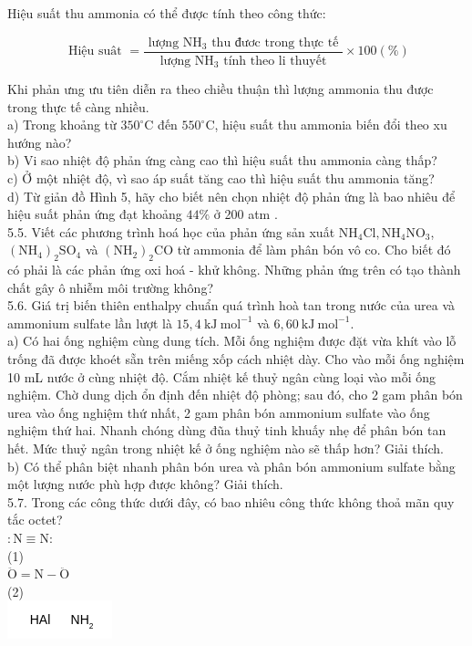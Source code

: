 \documentclass[10pt]{article}
\begin{document}
Hiệu suất thu ammonia có thể được tính theo công thức:

$$
\text { Hiệu suât }=\frac{\text { lượng } \mathrm{NH}_{3} \text { thu đươc trong thực tế }}{\text { lượng } \mathrm{NH}_{3} \text { tính theo li thuyết }} \times 100(\%)
$$

Khi phản ưng ưu tiên diễn ra theo chiều thuận thì lượng ammonia thu được trong thực tế càng nhiều.\\
a) Trong khoảng từ $350^{\circ} \mathrm{C}$ đến $550^{\circ} \mathrm{C}$, hiệu suất thu ammonia biến đổi theo xu hướng nào?\\
b) Vi sao nhiệt độ phản ứng càng cao thì hiệu suất thu ammonia càng thấp?\\
c) Ở một nhiệt độ, vì sao áp suất tăng cao thì hiệu suất thu ammonia tăng?\\
d) Từ giản đồ Hình 5, hãy cho biết nên chọn nhiệt độ phản ứng là bao nhiêu để hiệu suất phản ứng đạt khoảng $44 \%$ ở 200 atm .\\
5.5. Viết các phương trình hoá học của phản ứng sản xuất $\mathrm{NH}_{4} \mathrm{Cl}, \mathrm{NH}_{4} \mathrm{NO}_{3}$, $\left(\mathrm{NH}_{4}\right)_{2} \mathrm{SO}_{4}$ và $\left(\mathrm{NH}_{2}\right)_{2} \mathrm{CO}$ từ ammonia để làm phân bón vô co. Cho biết đó có phải là các phản ứng oxi hoá - khử không. Những phản ứng trên có tạo thành chất gây ô nhiễm môi trường không?\\
5.6. Giá trị biến thiên enthalpy chuẩn quá trình hoà tan trong nước của urea và ammonium sulfate lần lượt là $15,4 \mathrm{~kJ} \mathrm{~mol}^{-1}$ và $6,60 \mathrm{~kJ} \mathrm{~mol}^{-1}$.\\
a) Có hai ống nghiệm cùng dung tích. Mỗi ống nghiệm được đặt vừa khít vào lỗ trống đã được khoét sẵn trên miếng xốp cách nhiệt dày. Cho vào mỗi ống nghiệm 10 mL nước ở cùng nhiệt độ. Cắm nhiệt kế thuỷ ngân cùng loại vào mỗi ống nghiệm. Chờ dung dịch ổn định đến nhiệt độ phòng; sau đó, cho 2 gam phân bón urea vào ống nghiệm thứ nhất, 2 gam phân bón ammonium sulfate vào ống nghiệm thứ hai. Nhanh chóng dùng đũa thuỷ tinh khuấy nhẹ để phân bón tan hết. Mức thuỷ ngân trong nhiệt kế ở ống nghiệm nào sẽ thấp hơn? Giải thích.\\
b) Có thể phân biệt nhanh phân bón urea và phân bón ammonium sulfate bằng một lượng nước phù hợp được không? Giải thích.\\
5.7. Trong các công thức dưới đây, có bao nhiêu công thức không thoả mãn quy tắc octet?\\
$: \mathrm{N} \equiv \mathrm{N}:$\\
(1)\\
$\ddot{\mathrm{O}}=\mathrm{N}-\ddot{\mathrm{O}}$\\
(2)\\
\includegraphics{smile-8e0175b473b9085073209b97a6c91ef4957e25e6}
\end{document}
